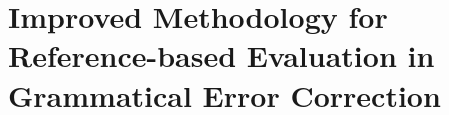 \documentclass[11pt]{article}
\begin{document}

\section*{Improved Methodology for Reference-based Evaluation in 
	Grammatical Error Correction}




\end{document}
